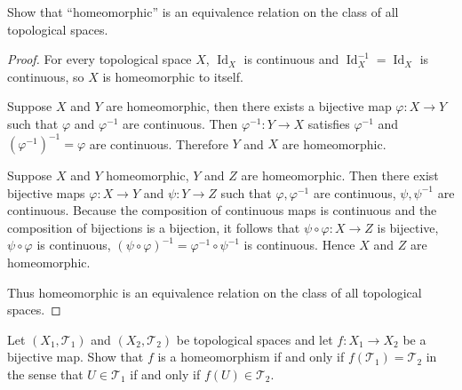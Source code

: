\begin{exercise}{2.20}
	Show that ``homeomorphic'' is an equivalence relation on the class of all topological spaces.
\end{exercise}

\begin{proof}
	For every topological space $X$, $\operatorname{Id}_{X}$ is continuous and $\operatorname{Id}_{X}^{-1} = \operatorname{Id}_{X}$ is continuous, so $X$ is homeomorphic to itself.

	Suppose $X$ and $Y$ are homeomorphic, then there exists a bijective map $\varphi: X\to Y$ such that $\varphi$ and $\varphi^{-1}$ are continuous. Then $\varphi^{-1}: Y \to X$ satisfies $\varphi^{-1}$ and ${(\varphi^{-1})}^{-1} = \varphi$ are continuous. Therefore $Y$ and $X$ are homeomorphic.

	Suppose $X$ and $Y$ homeomorphic, $Y$ and $Z$ are homeomorphic. Then there exist bijective maps $\varphi: X\to Y$ and $\psi: Y\to Z$ such that $\varphi, \varphi^{-1}$ are continuous, $\psi, \psi^{-1}$ are continuous. Because the composition of continuous maps is continuous and the composition of bijections is a bijection, it follows that $\psi\circ \varphi: X\to Z$ is bijective, $\psi\circ\varphi$ is continuous, ${(\psi\circ\varphi)}^{-1} = \varphi^{-1}\circ\psi^{-1}$ is continuous. Hence $X$ and $Z$ are homeomorphic.

	Thus homeomorphic is an equivalence relation on the class of all topological spaces.
\end{proof}

\begin{exercise}{2.21}\label{exercise:2.21}
	Let $(X_{1}, \mathscr{T}_{1})$ and $(X_{2}, \mathscr{T}_{2})$ be topological spaces and let $f: X_{1}\to X_{2}$ be a bijective map. Show that $f$ is a homeomorphism if and only if $f(\mathscr{T}_{1}) = \mathscr{T}_{2}$ in the sense that $U\in\mathscr{T}_{1}$ if and only if $f(U)\in \mathscr{T}_{2}$.
\end{exercise}

